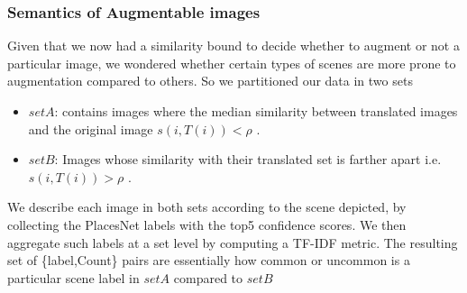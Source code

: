  
 
\subsubsection{Semantics of Augmentable images}
Given that we now had a similarity bound to decide whether to augment or not a particular image, we wondered whether certain types of scenes are more prone to augmentation compared to others.  So we partitioned our data in two sets
\begin{itemize}
	\item $set A$: contains images where the median similarity  between translated images and the original image ${s(i,T(i))} < \rho$ .
	
	\item $set B$:  Images whose similarity with their translated set is farther apart i.e. ${s(i,T(i))} > \rho$ .
\end{itemize}


We describe each image in both sets according to the scene depicted, by collecting the PlacesNet \cite{zhou2014learning} labels with the top5 confidence scores. We then aggregate such labels at a set level by computing a TF-IDF metric. The resulting set of \{label,Count\} pairs are essentially how common or uncommon is a particular scene label in $setA$ compared to $setB$ 




